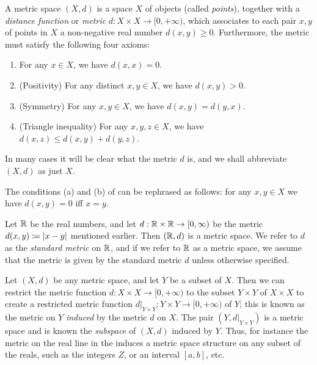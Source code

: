 \begin{defn}\label{ii:1.1.2}
  A metric space \((X, d)\) is a space \(X\) of objects (called \emph{points}), together with a \emph{distance function} or \emph{metric} \(d : X \times X \to [0, +\infty)\), which associates to each pair \(x, y\) of points in \(X\) a non-negative real number \(d(x, y) \geq 0\).
  Furthermore, the metric must satisfy the following four axioms:
  \begin{enumerate}
    \item\label{ii:1.1.2.a} For any \(x \in X\), we have \(d(x, x) = 0\).
    \item\label{ii:1.1.2.b} (Positivity) For any distinct \(x, y \in X\), we have \(d(x, y) > 0\).
    \item\label{ii:1.1.2.c} (Symmetry) For any \(x, y \in X\), we have \(d(x, y) = d(y, x)\).
    \item\label{ii:1.1.2.d} (Triangle inequality) For any \(x, y, z \in X\), we have \(d(x, z) \leq d(x, y) + d(y, z)\).
  \end{enumerate}
\end{defn}

\begin{note}
  In many cases it will be clear what the metric \(d\) is, and we shall abbreviate \((X, d)\) as just \(X\).
\end{note}

\begin{rmk}\label{ii:1.1.3}
  The conditions (a) and (b) of  can be rephrased as follows:
  for any \(x, y \in X\) we have \(d(x, y) = 0\) iff \(x = y\).
\end{rmk}

\begin{eg}\label{ii:1.1.4}
  Let \(\mathbb{R}\) be the real numbers, and let \(d : \mathbb{R} \times \mathbb{R} \to [0, \infty)\) be the metric \(d(x, y) \coloneqq \left\lvert x - y\right\rvert\) mentioned earlier.
  Then \((\mathbb{R}, d)\) is a metric space.
  We refer to \(d\) as the \emph{standard metric} on \(\mathbb{R}\), and if we refer to \(\mathbb{R}\) as a metric space, we assume that the metric is given by the standard metric \(d\) unless otherwise specified.
\end{eg}

\begin{eg}\label{ii:1.1.5}
  Let \((X, d)\) be any metric space, and let \(Y\) be a subset of \(X\).
  Then we can restrict the metric function \(d : X \times X \to [0, +\infty)\) to the subset \(Y \times Y\) of \(X \times X\) to create a restricted metric function \(d|_{Y \times Y} : Y \times Y \to [0, +\infty)\) of \(Y\);
  this is known as the metric on \(Y\) \emph{induced} by the metric \(d\) on \(X\).
  The pair \((Y, d|_{Y \times Y})\) is a metric space and is known the \emph{subspace} of \((X, d)\) induced by \(Y\).
  Thus, for instance the metric on the real line in the  induces a metric space structure on any subset of the reals, such as the integers \(Z\), or an interval \([a, b]\), etc.
\end{eg}

